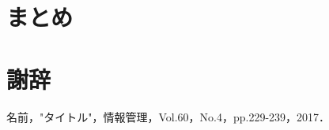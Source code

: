 \documentclass[a4paper,11pt]{ujreport}
\begin{document}
\chapter{まとめ}\label{chap:end_chapter}

\chapter*{謝辞}
\thispagestyle{empty}



\begin{thebibliography}{99}
\thispagestyle{empty}

名前，"タイトル"，情報管理，Vol.60，No.4，pp.229-239，2017．


\end{thebibliography}
\end{document}

